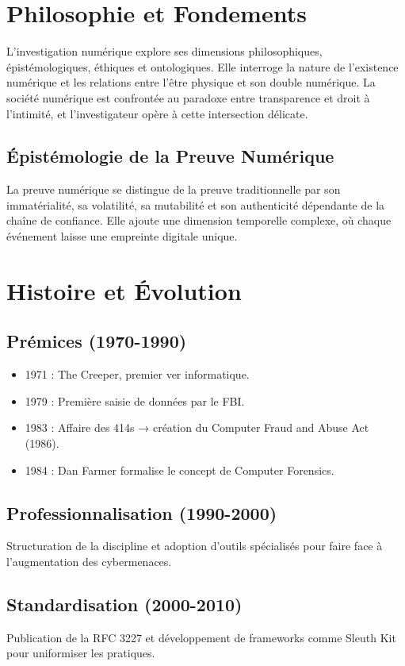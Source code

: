 \documentclass[12pt]{article}
\begin{document}
\section{Philosophie et Fondements}
L’investigation numérique explore ses dimensions philosophiques, épistémologiques, éthiques et ontologiques. Elle interroge la nature de l’existence numérique et les relations entre l’être physique et son double numérique. La société numérique est confrontée au paradoxe entre transparence et droit à l’intimité, et l’investigateur opère à cette intersection délicate.

\subsection{Épistémologie de la Preuve Numérique}
La preuve numérique se distingue de la preuve traditionnelle par son immatérialité, sa volatilité, sa mutabilité et son authenticité dépendante de la chaîne de confiance. Elle ajoute une dimension temporelle complexe, où chaque événement laisse une empreinte digitale unique.

\section{Histoire et Évolution}
\subsection{Prémices (1970-1990)}
\begin{itemize}[leftmargin=*]
    \item 1971 : The Creeper, premier ver informatique.
    \item 1979 : Première saisie de données par le FBI.
    \item 1983 : Affaire des 414s → création du Computer Fraud and Abuse Act (1986).
    \item 1984 : Dan Farmer formalise le concept de Computer Forensics.
\end{itemize}

\subsection{Professionnalisation (1990-2000)}
Structuration de la discipline et adoption d’outils spécialisés pour faire face à l’augmentation des cybermenaces.

\subsection{Standardisation (2000-2010)}
Publication de la RFC 3227 et développement de frameworks comme Sleuth Kit pour uniformiser les pratiques.
\end{document}
